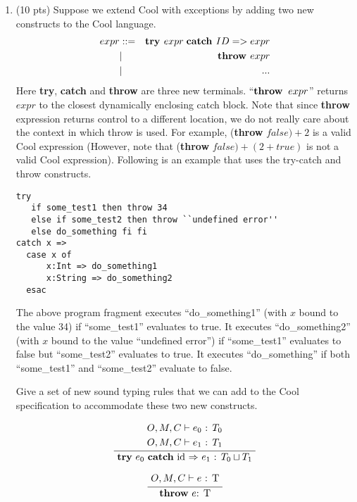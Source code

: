 \documentclass[10pt]{article}
\newcommand{\infertext}[2]{\infer{{\textrm{#2}}}{\begin{aligned}#1\end{aligned}}}
\begin{document}
\begin{enumerate}
\medskip
\item  (10 pts) Suppose we extend Cool with exceptions by adding two new constructs
to the Cool language.
\begin{eqnarray*}
  expr & ::= & \textit{\bf try } expr \;\textit{\bf catch } ID => expr \\
	   & |   & \textit{\bf throw } expr \\
	   & | & ...
\end{eqnarray*}
Here {\bf try}, {\bf catch} and {\bf throw} are three new terminals.
  ``${\bf throw }\;\; expr$'' returns $expr$ to the
  closest dynamically enclosing catch block.
Note that since {\bf throw} expression returns control to a different location, we do not really
  care about the context in which throw is used. For example,
({\bf throw} $false) + 2$ is a valid Cool expression (However, note that
  ({\bf throw} $false) + (2+true)$ is not a valid Cool expression).  Following is an example that uses the
try-catch and throw constructs.
\begin{verbatim}
try
   if some_test1 then throw 34
   else if some_test2 then throw ``undefined error''
   else do_something fi fi
catch x =>
  case x of
	  x:Int => do_something1
	  x:String => do_something2
  esac
\end{verbatim}

The above program fragment executes
  ``do\_something1'' (with $x$ bound to the value 34) if ``some\_test1''
  evaluates to \textsf{true}. It executes ``do\_something2'' (with $x$ bound to the
  value ``undefined error'') if ``some\_test1'' evaluates to \textsf{false} but
  ``some\_test2'' evaluates to \textsf{true}. It executes ``do\_something'' if both
  ``some\_test1'' and ``some\_test2'' evaluate to \textsf{false}.


Give a set of new sound typing rules that we can add to the Cool specification
to accommodate these two new constructs.

\begin{equation} \infertext{
	& \textrm{ $O, M, C \vdash e_0$ : $T_0$ } \\
	& \textrm{ $O, M, C \vdash e_1$ : $T_1$ } \\
} {
	\textbf{try} $e_0$ \textbf{catch} id \textbf{$\Rightarrow$} $e_1$ : $T_0 \sqcup T_1$
}\end{equation}

\begin{equation} \infertext{
	\textrm{ $O, M, C \vdash e$ : T }	
} {
	\textbf{throw} $e$: T
}\end{equation}


\end{enumerate}
\end{document}
